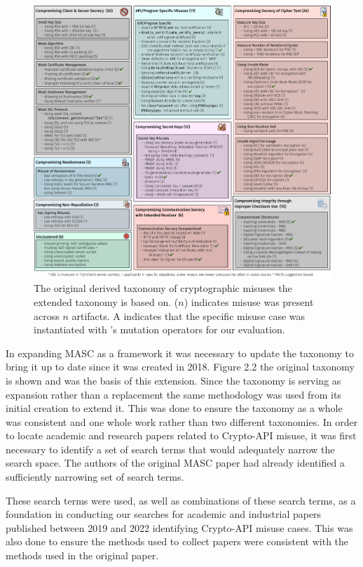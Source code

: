 \begin{figure}[!ht]
	\centering
    \includegraphics[width=0.96\linewidth]{figures/taxonomy.pdf}
	\vspace{-1.em}
    \caption{\small The original derived taxonomy of cryptographic misuses the extended taxonomy is based on. ($n$) indicates misuse was present across $n$ artifacts.  A \checkmark indicates that the specific misuse case was instantiated with \tool's mutation operators for our evaluation.}
    \label{fig:taxonomy}
	
\end{figure}


In expanding MASC as a framework it was necessary to update the taxonomy to bring it up to date since it was created in 2018. Figure 2.2 the original taxonomy is shown and was the basis of this extension. Since the taxonomy is serving as expansion rather than a replacement the same methodology was used from its initial creation to extend it. This was done to ensure the taxonomy as a whole was consistent and one whole work rather than two different taxonomies. In order to locate academic and research papers related to Crypto-API misuse, it was first necessary to identify a set of search terms that would adequately narrow the search space. The authors of the original MASC paper had already identified a sufficiently narrowing set of search terms. 

These search terms were used, as well as combinations of these search terms, as a foundation in conducting our searches for academic and industrial papers published between 2019 and 2022 identifying Crypto-API misuse cases. This was also done to ensure the methods used to collect papers were consistent with the methods used in the original paper.  

